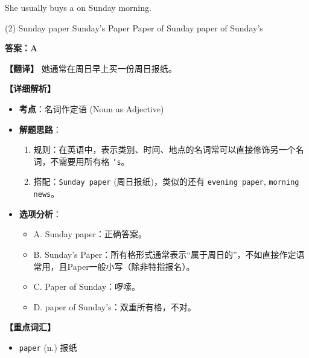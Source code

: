 \documentclass[11pt, a4paper]{article}
\newcommand{\analysis}[4]{
    \begin{solutionbox}
        \textbf{答案：#1}
        
        \textbf{【翻译】} #2
        
        \textbf{【详细解析】}
        #3
        
        \textbf{【重点词汇】}
        #4
    \end{solutionbox}
}
\newcommand{\blank}{\underline{\hspace{1.5cm}}}
\begin{document}
\begin{questions}
    \item She usually buys a \blank on Sunday morning.
    \begin{tasks}(2)
        \task Sunday paper \task Sunday's Paper
        \task Paper of Sunday \task paper of Sunday's
    \end{tasks}
    \analysis{A}{她通常在周日早上买一份周日报纸。}{
        \begin{itemize}
            \item \textbf{考点}：名词作定语 (Noun as Adjective)
            \item \textbf{解题思路}：
                \begin{enumerate}
                    \item 规则：在英语中，表示类别、时间、地点的名词常可以直接修饰另一个名词，不需要用所有格 \texttt{'s}。
                    \item 搭配：\texttt{Sunday paper} (周日报纸)，类似的还有 \texttt{evening paper}, \texttt{morning news}。
                \end{enumerate}
            \item \textbf{选项分析}：
                \begin{itemize}
                    \item A. Sunday paper：正确答案。
                    \item B. Sunday's Paper：所有格形式通常表示“属于周日的”，不如直接作定语常用，且Paper一般小写（除非特指报名）。
                    \item C. Paper of Sunday：啰嗦。
                    \item D. paper of Sunday's：双重所有格，不对。
                \end{itemize}
        \end{itemize}
    }{
        \begin{itemize}
            \item \texttt{paper} (n.) 报纸
        \end{itemize}
    }


\end{questions}
\end{document}
